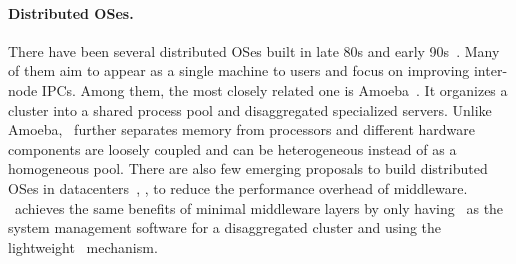 \documentclass[10pt,times,twocolumn]{z2-article}
\begin{document}
{{{{{{{%


\paragraph{Distributed OSes.}
There have been several distributed OSes built in late 80s and early 90s~\cite{Amoeba-Status,Amoeba-Experience,Sprite,MOSIX,V-System,Accent-SOSP,DEMOS-SOSP,Charlotte}.
%
Many of them aim to appear as a single machine to users and focus on improving inter-node IPCs. 
Among them, the most closely related one is Amoeba~\cite{Amoeba-Status,Amoeba-Experience}.
It organizes a cluster into a shared process pool and disaggregated specialized servers.
Unlike Amoeba, \lego\ further separates memory from processors and different hardware components are
loosely coupled and can be heterogeneous instead of as a homogeneous pool.
There are also few emerging proposals to build distributed OSes in datacenters~\cite{Wolfgang-hotcloud18,Schwarzkopf-apsys13}, 
\eg, to reduce the performance overhead of middleware.
\lego\ achieves the same benefits of minimal middleware layers by only 
having \lego\ as the system management software for a disaggregated cluster
and using the lightweight \vnode\ mechanism.

}}}}}}}
\end{document}
